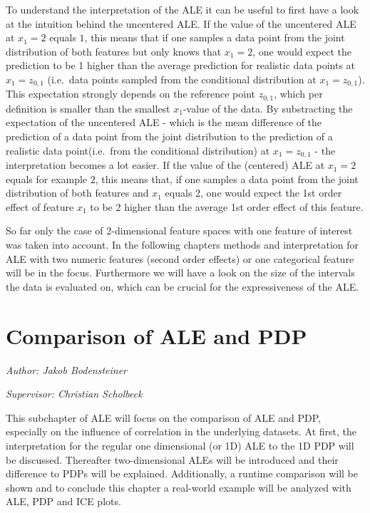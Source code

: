 \documentclass[]{krantz}
\begin{document}
To understand the interpretation of the ALE it can be useful to first
have a look at the intuition behind the uncentered ALE. If the value of
the uncentered ALE at \(x_1 = 2\) equals \(1\), this means that if one
samples a data point from the joint distribution of both features but
only knows that \(x_1 = 2\), one would expect the prediction to be 1
higher than the average prediction for realistic data points at
\(x_1 = z_{0,1}\) (i.e.~data points sampled from the conditional
distribution at \(x_1 = z_{0,1}\)). This expectation strongly depends on
the reference point \(z_{0,1}\), which per definition is smaller than
the smallest \(x_1\)-value of the data. By substracting the expectation
of the uncentered ALE - which is the mean difference of the prediction
of a data point from the joint distribution to the prediction of a
realistic data point(i.e.~from the conditional distribution) at
\(x_1 = z_{0,1}\) - the interpretation becomes a lot easier. If the
value of the (centered) ALE at \(x_1 = 2\) equals for example \(2\),
this means that, if one samples a data point from the joint distribution
of both features and \(x_1\) equals 2, one would expect the 1st order
effect of feature \(x_1\) to be 2 higher than the average 1st order
effect of this feature.

So far only the case of 2-dimensional feature spaces with one feature of
interest was taken into account. In the following chapters methods and
interpretation for ALE with two numeric features (second order effects)
or one categorical feature will be in the focus. Furthermore we will
have a look on the size of the intervals the data is evaluated on, which
can be crucial for the expressiveness of the ALE.

\chapter{Comparison of ALE and PDP}\label{ale-pdp}

\emph{Author: Jakob Bodensteiner}

\emph{Supervisor: Christian Scholbeck}

This subchapter of ALE will focus on the comparison of ALE and PDP,
especially on the influence of correlation in the underlying datasets.
At first, the interpretation for the regular one dimensional (or 1D) ALE
to the 1D PDP will be discussed. Thereafter two-dimensional ALEs will be
introduced and their difference to PDPs will be explained. Additionally,
a runtime comparison will be shown and to conclude this chapter a
real-world example will be analyzed with ALE, PDP and ICE plots.
\end{document}
